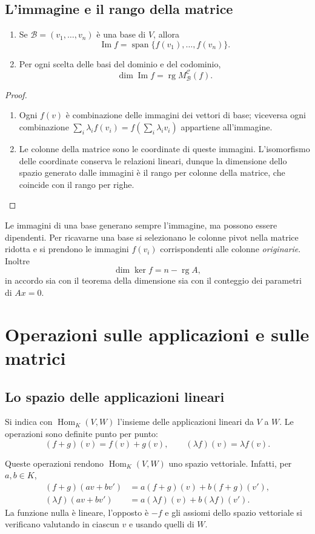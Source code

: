 \subsection{L'immagine e il rango della matrice}
\begin{proposizione}
\begin{enumerate}[label=\arabic*.]
\item Se $\mathcal B=(v_1,\ldots,v_n)$ è una base di $V$, allora
\[
 \operatorname{Im}f=\operatorname{span}\{f(v_1),\ldots,f(v_n)\}.
\]
\item Per ogni scelta delle basi del dominio e del codominio,
\[
 \dim\operatorname{Im}f=\operatorname{rg}M_{\mathcal B}^{\mathcal C}(f).
\]
\end{enumerate}
\end{proposizione}
\begin{proof}
\begin{enumerate}[label=\arabic*.]
\item Ogni $f(v)$ è combinazione delle immagini dei vettori di base; viceversa ogni combinazione $\sum_i\lambda_if(v_i)=f(\sum_i\lambda_iv_i)$ appartiene all'immagine.
\item Le colonne della matrice sono le coordinate di queste immagini. L'isomorfismo delle coordinate conserva le relazioni lineari, dunque la dimensione dello spazio generato dalle immagini è il rango per colonne della matrice, che coincide con il rango per righe.
\end{enumerate}
\end{proof}
Le immagini di una base generano sempre l'immagine, ma possono essere dipendenti. Per ricavarne una base si selezionano le colonne pivot nella matrice ridotta e si prendono le immagini $f(v_i)$ corrispondenti alle colonne \emph{originarie}. Inoltre
\[
 \dim\ker f=n-\operatorname{rg}A,
\]
in accordo sia con il teorema della dimensione sia con il conteggio dei parametri di $Ax=0$.

\section{Operazioni sulle applicazioni e sulle matrici}
\subsection{Lo spazio delle applicazioni lineari}
\begin{definizione}
Si indica con $\operatorname{Hom}_K(V,W)$ l'insieme delle applicazioni lineari da $V$ a $W$. Le operazioni sono definite punto per punto:
\[
 (f+g)(v)=f(v)+g(v),\qquad (\lambda f)(v)=\lambda f(v).
\]
\end{definizione}
Queste operazioni rendono $\operatorname{Hom}_K(V,W)$ uno spazio vettoriale. Infatti, per $a,b\in K$,
\begin{align*}
 (f+g)(av+bv')&=a(f+g)(v)+b(f+g)(v'),\\
 (\lambda f)(av+bv')&=a(\lambda f)(v)+b(\lambda f)(v').
\end{align*}
La funzione nulla è lineare, l'opposto è $-f$ e gli assiomi dello spazio vettoriale si verificano valutando in ciascun $v$ e usando quelli di $W$.

